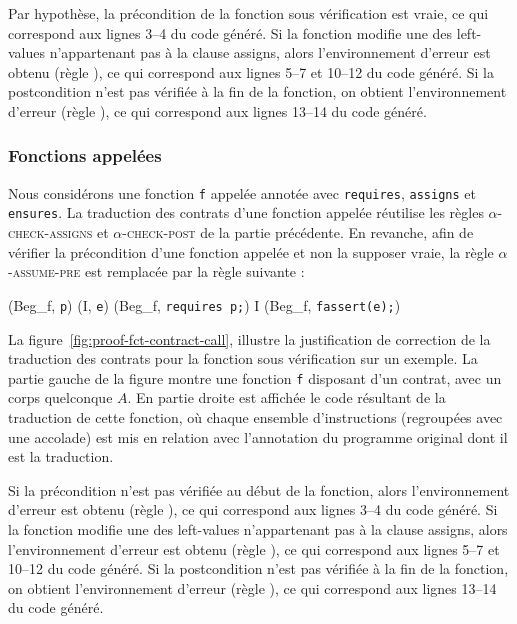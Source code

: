 Par hypothèse, la précondition de la fonction sous vérification est vraie, ce
qui correspond aux lignes 3--4 du code généré.
Si la fonction modifie une des left-values n'appartenant pas à la clause
assigns, alors l'environnement d'erreur est obtenu (règle ), ce qui
correspond aux lignes 5--7 et 10--12 du code généré.
Si la postcondition n'est pas vérifiée à la fin de la fonction, on obtient
l'environnement d'erreur (règle ), ce qui correspond aux lignes
13--14 du code généré.


\subsubsection{Fonctions appelées}



Nous considérons une fonction \lstinline'f' appelée annotée avec
\lstinline'requires', \lstinline'assigns' et \lstinline'ensures'.
La traduction des contrats d'une fonction appelée réutilise les règles
\textsc{$\alpha$-check-assigns} et \textsc{$\alpha$-check-post} de la partie
précédente.
En revanche, afin de vérifier la précondition d'une fonction appelée et non la
supposer vraie, la règle \textsc{$\alpha$-assume-pre} est remplacée par la règle
suivante :

{\scriptsize
  {
    {(Beg_f, \mbox{\lstinline'p'})  (I, \mbox{\lstinline'e'})}
    {(Beg_f, \mbox{\lstinline'requires p;'})
      I \concat (Beg_f, \mbox{\lstinline'fassert(e);'})}{}
  }
}

La figure~\ref{fig:proof-fct-contract-call}, illustre la justification de
correction
de la traduction des contrats pour la fonction sous vérification sur un exemple.
La partie gauche de la figure montre une fonction \lstinline'f' disposant d'un
contrat, avec un corps quelconque $A$.
En partie droite est affichée le code résultant de la traduction de cette
fonction, où chaque ensemble d'instructions (regroupées avec une accolade) est
mis en relation avec l'annotation du programme original dont il est la
traduction.

Si la précondition n'est pas vérifiée au début de la fonction, alors
l'environnement d'erreur est obtenu (règle ), ce qui correspond aux
lignes 3--4 du code généré.
Si la fonction modifie une des left-values n'appartenant pas à la clause
assigns, alors l'environnement d'erreur est obtenu (règle ), ce qui
correspond aux lignes 5--7 et 10--12 du code généré.
Si la postcondition n'est pas vérifiée à la fin de la fonction, on obtient
l'environnement d'erreur (règle ), ce qui correspond aux lignes
13--14 du code généré.



